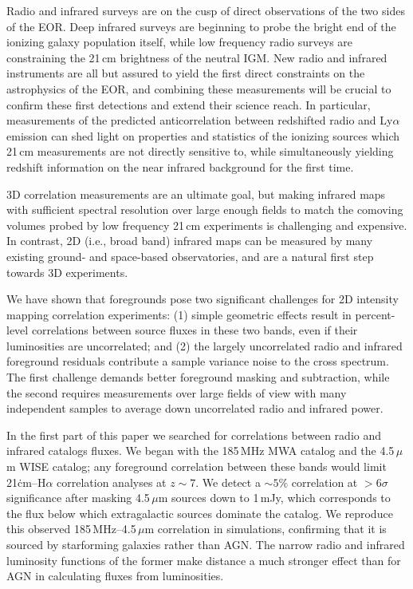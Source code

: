 \documentclass[numberedappendix]{emulateapj}
\begin{document}
Radio and infrared surveys are on the cusp of direct observations of the two sides of the EOR. Deep infrared surveys are beginning to probe the bright end of the ionizing galaxy population itself, while low frequency radio surveys are constraining the 21\,cm brightness of the neutral IGM. New radio and infrared instruments are all but assured to yield the first direct constraints on the astrophysics of the EOR, and combining these measurements will be crucial to confirm these first detections and extend their science reach. In particular, measurements of the predicted anticorrelation between redshifted radio and Ly$\alpha$ emission can shed light on properties and statistics of the ionizing sources which 21\,cm measurements are not directly sensitive to, while simultaneously yielding redshift information on the near infrared background for the first time. 

3D correlation measurements are an ultimate goal, but making infrared maps with sufficient spectral resolution over large enough fields to match the comoving volumes probed by low frequency 21\,cm experiments is challenging and expensive. In contrast, 2D (i.e., broad band) infrared maps can be measured by many existing ground- and space-based observatories, and are a natural first step towards 3D experiments. 

We have shown that foregrounds pose two significant challenges for 2D intensity mapping correlation experiments: (1) simple geometric effects result in percent-level correlations between source fluxes in these two bands, even if their luminosities are uncorrelated; and (2) the largely uncorrelated radio and infrared foreground residuals contribute a sample variance noise to the cross spectrum. The first challenge demands better foreground masking and subtraction, while the second requires measurements over large fields of view with many independent samples to average down uncorrelated radio and infrared power.

In the first part of this paper we searched for correlations between radio and infrared catalogs fluxes. We began with the 185\,MHz MWA catalog and the 4.5\,$\mu$m WISE catalog; any foreground correlation between these bands would limit 21\.cm--H$\alpha$ correlation analyses at $z\sim7$. We detect a $\sim5\%$ correlation at $>6\sigma$ significance after masking 4.5\,$\mu$m sources down to 1\,mJy, which corresponds to the flux below which extragalactic sources dominate the catalog. We reproduce this observed 185\,MHz--4.5\,$\mu$m correlation in simulations, confirming that it is sourced by starforming galaxies rather than AGN. The narrow radio and infrared luminosity functions of the former make distance a much stronger effect than for AGN in calculating fluxes from luminosities. 
\end{document}
